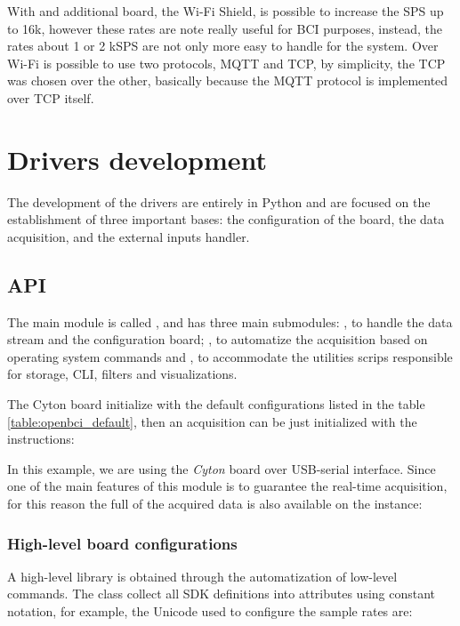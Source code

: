 With and additional board, the Wi-Fi Shield, is possible to increase the \gls*{SPS} up to 16k, however these rates are note really useful for \gls*{BCI} purposes, instead, the rates about 1 or 2 k\gls*{SPS} are not only more easy to handle for the system. Over Wi-Fi is possible to use two protocols, \Gls*{MQTT} and \gls*{TCP}, by simplicity, the \gls*{TCP} was chosen over the other, basically because the \gls*{MQTT} protocol is implemented over \gls*{TCP} itself.

\section{Drivers development}

The development of the drivers are entirely in Python and are focused on the establishment of three important bases: the configuration of the board, the data acquisition, and the external inputs handler.

\subsection{\Gls*{API}}

The main module is called , and has three main submodules: , to handle the data stream and the configuration board; , to automatize the acquisition based on operating system commands and , to accommodate the utilities scrips responsible for storage, \gls*{CLI}, filters and visualizations. 

The Cyton board initialize with the default configurations listed in the table \ref{table:openbci_default}, then an acquisition can be just initialized with the instructions:




In this example, we are using the \textit{Cyton} board over USB-serial interface. Since one of the main features of this module is to guarantee the real-time acquisition, for this reason the full  of the acquired data is also available on the  instance:



\subsubsection{High-level board configurations}
A high-level library is obtained through the automatization of low-level commands. The  class collect all \gls*{SDK} definitions into attributes using constant notation, for example, the Unicode used to configure the sample rates are:

